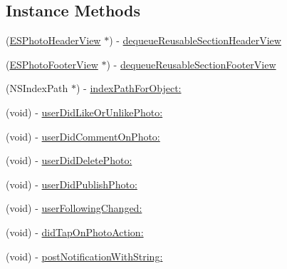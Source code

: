 \subsection*{Instance Methods}
\begin{DoxyCompactItemize}
\item 
(\hyperlink{interface_e_s_photo_header_view}{E\+S\+Photo\+Header\+View} $\ast$) -\/ \hyperlink{interface_e_s_popular_view_controller_a5740e2c75f1b3388360abfcb1ac20e43}{dequeue\+Reusable\+Section\+Header\+View}
\item 
(\hyperlink{interface_e_s_photo_footer_view}{E\+S\+Photo\+Footer\+View} $\ast$) -\/ \hyperlink{interface_e_s_popular_view_controller_a3983c22253d19d8f7286af56cb787e44}{dequeue\+Reusable\+Section\+Footer\+View}
\item 
(N\+S\+Index\+Path $\ast$) -\/ \hyperlink{interface_e_s_popular_view_controller_a5904b8edbc25a70e527ccf7ea5f0c996}{index\+Path\+For\+Object\+:}
\item 
(void) -\/ \hyperlink{interface_e_s_popular_view_controller_a86acd96b3f301701f931a6209fbf23ef}{user\+Did\+Like\+Or\+Unlike\+Photo\+:}
\item 
(void) -\/ \hyperlink{interface_e_s_popular_view_controller_ab1c1c95a0b99d1c817150a687844b14a}{user\+Did\+Comment\+On\+Photo\+:}
\item 
(void) -\/ \hyperlink{interface_e_s_popular_view_controller_aa4c39b8a66f21e667f7e8300693b93aa}{user\+Did\+Delete\+Photo\+:}
\item 
(void) -\/ \hyperlink{interface_e_s_popular_view_controller_af2701fab577428be458401b977d96077}{user\+Did\+Publish\+Photo\+:}
\item 
(void) -\/ \hyperlink{interface_e_s_popular_view_controller_a03a06063fdf134765a280ff4d7f7edf3}{user\+Following\+Changed\+:}
\item 
(void) -\/ \hyperlink{interface_e_s_popular_view_controller_a815d358fb60682609f6f7399ce1fad44}{did\+Tap\+On\+Photo\+Action\+:}
\item 
(void) -\/ \hyperlink{interface_e_s_popular_view_controller_a9d7ff62d02bb6300d0fc1a3061118076}{post\+Notification\+With\+String\+:}
\end{DoxyCompactItemize}
